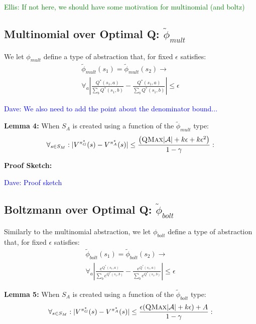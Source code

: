 \documentclass{article}
\newcommand{\ep}{\widetilde \phi}
\newcommand\dnote[1]{\textcolor{blue}{Dave: #1}}
\newcommand\enote[1]{\textcolor{green}{Ellis: #1}}
\begin{document}
\enote{If not here, we should have some motivation for multinomial (and boltz)}
\subsection{Multinomial over Optimal Q: $\ep_{mult}$}

We let $\phi_{mult}$ define a type of abstraction that, for fixed $\epsilon$ satisfies:
\begin{multline}
\ep_{mult}(s_1) = \ep_{mult}(s_2) \rightarrow \\
\forall_{a} \left|\frac{Q^*(s_1,a)}{\sum_b Q^*(s_1,b)} - \frac{Q^*(s_1,a)}{\sum_b Q^*(s_1,b)}\right| \leq \epsilon
\end{multline}

\dnote{We also need to add the point about the denominator bound...}

{\bf Lemma 4:} When $S_A$ is created using a function of the $\ep_{mult}$ type:
\begin{equation}
\forall_{s \in S_M} : | V^{\pi^*_G}(s) - V^{\pi^*_{A}}(s) | \leq \frac{\left(\textsc{QMax}|\mathcal{A}| + k \epsilon + k \epsilon^2\right)}{1-\gamma}:
\end{equation}

{\bf Proof Sketch:}

\dnote{Proof sketch}


\subsection{Boltzmann over Optimal Q: $\ep_{bolt}$}

Similarly to the multinomial abstraction, we let $\phi_{bolt}$ define a type of abstraction that, for fixed $\epsilon$ satisfies:
\begin{multline}
\ep_{bolt}(s_1) = \ep_{bolt}(s_2) \rightarrow \\
\forall_{a} \left|\frac{e^{Q^*(s_1,a)}}{\sum_b e^{Q^*(s_1,b)}} - \frac{e^{Q^*(s_1,a)}}{\sum_b e^{Q^*(s_1,b)}}\right| \leq \epsilon
\end{multline}

{\bf Lemma 5:} When $S_A$ is created using a function of the $\ep_{bolt}$ type:
\begin{equation}
\forall_{s \in S_M} : | V^{\pi^*_G}(s) - V^{\pi^*_{A}}(s) | \leq \frac{\epsilon(\textsc{QMax}|\mathcal{A}| + k\epsilon) + A}{1-\gamma}:
\end{equation}
\end{document}
